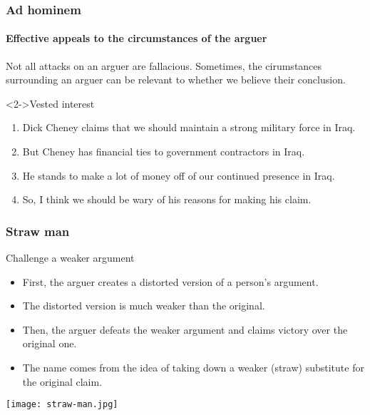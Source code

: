 \documentclass[10pt,letterpaper,xcolor=dvipsnames]{beamer}
\begin{document}
\begin{frame}
  \frametitle{Ad hominem}
  \framesubtitle{Effective appeals to the circumstances of the arguer}
  
  Not all attacks on an arguer are fallacious.  Sometimes, the cirumstances surrounding an arguer can be relevant to whether we believe their conclusion.
  
  \begin{block}<2->{Vested interest}
    \begin{enumerate}
      \item Dick Cheney claims that we should maintain a strong military force in Iraq.
      \item But Cheney has financial ties to government contractors in Iraq.
      \item He stands to make a lot of money off of our continued presence in Iraq.
      \item So, I think we should be wary of his reasons for making his claim.
    \end{enumerate}
  \end{block}
  
  
\end{frame}

\begin{frame}
  \frametitle{Straw man}
  
  \begin{block}{Challenge a weaker argument}
    \begin{itemize}
      \item First, the arguer creates a distorted version of a person's argument.
      \item The distorted version is much weaker than the original.
      \item Then, the arguer defeats the weaker argument and claims victory over the original one.
      \item The name comes from the idea of taking down a weaker (straw) substitute for the original claim.
    \end{itemize}
  \end{block}
  
  \begin{center}
    \texttt{[image: straw-man.jpg]}
  \end{center}
  
\end{frame}
\end{document}
